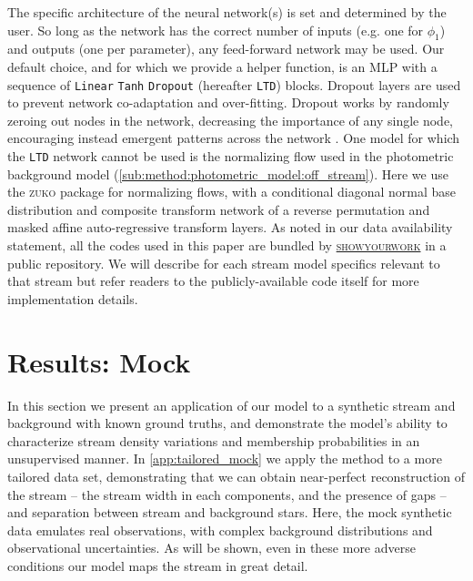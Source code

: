 \documentclass[twocolumn, linenumbers]{aastex631}
\newcommand{\code}[1]{\textsc{#1}}
\newcommand{\package}[1]{\code{#1}}
\begin{document}
        The specific architecture of the neural network(s) is set and determined
        by the user. So long as the network has the correct number of inputs
        (e.g. one for $\phi_1$) and outputs (one per parameter), any
        feed-forward network may be used.  Our default choice, and for which we
        provide a helper function, is an MLP with a sequence of \texttt{Linear}
        \!\!\textrightarrow \texttt{Tanh} \!\!\textrightarrow \texttt{Dropout}
        (hereafter \texttt{LTD}) blocks.  Dropout layers are used to prevent
        network co-adaptation and over-fitting. Dropout works by randomly
        zeroing out nodes in the network, decreasing the importance of any
        single node, encouraging instead emergent patterns across the network
        \citep{GalGhahramani2015}.  One model for which the \texttt{LTD} network
        cannot be used is the normalizing flow used in the photometric
        background model (\autoref{sub:method:photometric_model:off_stream}).
        Here we use the \package{zuko} package for normalizing flows, with a
        conditional diagonal normal base distribution and composite transform
        network of a reverse permutation and masked affine auto-regressive
        transform layers. As noted in our data availability statement, all the
        codes used in this paper are bundled by
        \href{https://github.com/showyourwork/showyourwork}{\package{showyourwork}}
        \citep{Luger+2021} in a public repository. We will describe for each
        stream model specifics relevant to that stream but refer readers to the
        publicly-available code itself for more implementation details.
        

\section{Results: Mock} \label{sec:results_mock}

    In this section we present an application of our model to a synthetic stream and background
    with known ground truths, and demonstrate the model's ability to
    characterize stream density variations and membership probabilities in an
    unsupervised manner.
    In \autoref{app:tailored_mock} we apply the method to a more tailored data set, demonstrating that we can obtain near-perfect reconstruction of the stream -- the stream width in each components, and the presence of gaps -- and separation between stream and background stars. 
    Here, the mock synthetic data emulates real observations, with complex background distributions and observational uncertainties. As will be shown, even in these more adverse conditions our model maps the stream in great detail.
\end{document}
